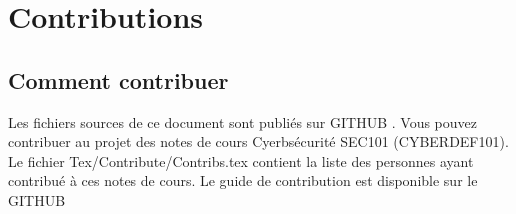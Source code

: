 
\section{Contributions}

\subsection{Comment contribuer}

Les fichiers sources de ce document sont publiés sur GITHUB  . Vous pouvez contribuer au projet des notes de cours Cyerbsécurité SEC101 (CYBERDEF101). Le fichier Tex/Contribute/Contribs.tex contient la liste des personnes ayant contribué à ces notes de cours.
Le guide de contribution est disponible sur le GITHUB


